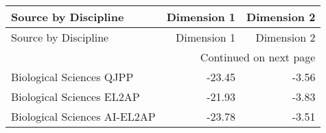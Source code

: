 \begin{longtable}{lrr}
\toprule
Source by Discipline & Dimension 1 & Dimension 2 \\
\midrule
\endfirsthead
\toprule
Source by Discipline & Dimension 1 & Dimension 2 \\
\midrule
\endhead
\midrule
\multicolumn{3}{r}{Continued on next page} \\
\midrule
\endfoot
\bottomrule
\endlastfoot
Biological Sciences QJPP & -23.45 & -3.56 \\
Biological Sciences EL2AP & -21.93 & -3.83 \\
Biological Sciences AI-EL2AP & -23.78 & -3.51 \\
\end{longtable}
